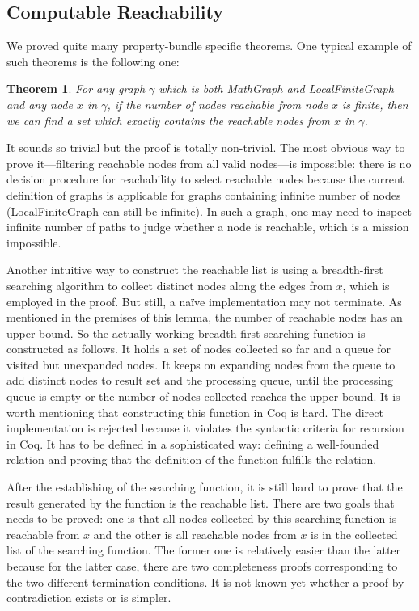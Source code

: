 \subsection{Computable Reachability}
We proved quite many property-bundle specific theorems. One typical
example of such theorems is the following one:
\newtheorem{mythm}{Theorem}
\begin{mythm}
For any graph $\gamma$ which is both MathGraph and LocalFiniteGraph
and any node $x$ in $\gamma$, if the number of nodes reachable from
node $x$ is finite, then we can find a set which exactly contains the
reachable nodes from $x$ in $\gamma$.
\end{mythm}
It sounds so trivial but the proof is totally non-trivial. The most
obvious way to prove it---filtering reachable nodes from all valid
nodes---is impossible: there is no decision procedure for reachability
to select reachable nodes because the current definition of graphs is
applicable for graphs containing infinite number of nodes
(LocalFiniteGraph can still be infinite). In such a graph, one may
need to inspect infinite number of paths to judge whether a node is
reachable, which is a mission impossible.

Another intuitive way to construct the reachable list is using a
breadth-first searching algorithm to collect distinct nodes along the
edges from $x$, which is employed in the proof. But still, a na\"ive
implementation may not terminate. As mentioned in the premises of this
lemma, the number of reachable nodes has an upper bound. So the
actually working breadth-first searching function is constructed as
follows. It holds a set of nodes collected so far and a queue for
visited but unexpanded nodes. It keeps on expanding nodes from the
queue to add distinct nodes to result set and the processing queue,
until the processing queue is empty or the number of nodes collected
reaches the upper bound. It is worth mentioning that constructing this
function in Coq is hard. The direct implementation is rejected because
it violates the syntactic criteria for recursion in Coq. It has to be
defined in a sophisticated way: defining a well-founded relation and
proving that the definition of the function fulfills the relation.

After the establishing of the searching function, it is still hard to
prove that the result generated by the function is the reachable
list. There are two goals that needs to be proved: one is that all
nodes collected by this searching function is reachable from $x$ and
the other is all reachable nodes from $x$ is in the
collected list of the searching function. The former one is relatively
easier than the latter because for the latter case, there are two
completeness proofs corresponding to the two different termination
conditions. It is not known yet whether a proof by contradiction
exists or is simpler.

